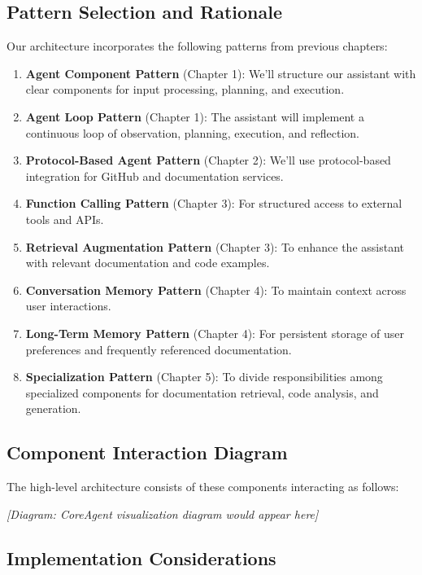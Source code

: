 \documentclass[11pt,oneside]{book}
\begin{document}
\subsection{Pattern Selection and
Rationale}\label{pattern-selection-and-rationale}

Our architecture incorporates the following patterns from previous
chapters:

\begin{enumerate}
\def\labelenumi{\arabic{enumi}.}
\item
  \textbf{Agent Component Pattern} (Chapter 1): We'll structure our
  assistant with clear components for input processing, planning, and
  execution.
\item
  \textbf{Agent Loop Pattern} (Chapter 1): The assistant will implement
  a continuous loop of observation, planning, execution, and reflection.
\item
  \textbf{Protocol-Based Agent Pattern} (Chapter 2): We'll use
  protocol-based integration for GitHub and documentation services.
\item
  \textbf{Function Calling Pattern} (Chapter 3): For structured access
  to external tools and APIs.
\item
  \textbf{Retrieval Augmentation Pattern} (Chapter 3): To enhance the
  assistant with relevant documentation and code examples.
\item
  \textbf{Conversation Memory Pattern} (Chapter 4): To maintain context
  across user interactions.
\item
  \textbf{Long-Term Memory Pattern} (Chapter 4): For persistent storage
  of user preferences and frequently referenced documentation.
\item
  \textbf{Specialization Pattern} (Chapter 5): To divide
  responsibilities among specialized components for documentation
  retrieval, code analysis, and generation.
\end{enumerate}

\subsection{Component Interaction
Diagram}\label{component-interaction-diagram}

The high-level architecture consists of these components interacting as
follows:

\emph{{[}Diagram: CoreAgent visualization diagram would appear here{]}}

\subsection{Implementation
Considerations}\label{implementation-considerations}
\end{document}
